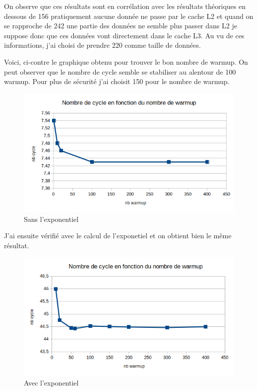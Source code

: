 \documentclass[12pt,a4paper]{article}
\begin{document}
On observe que ces résultats sont en corrélation avec les résultats théoriques
en dessous de 156 pratiquement aucune donnée ne passe par le cache L2 et 
quand on se rapproche de 242 une partie des données ne semble plus passer 
dans L2 je suppose donc que ces données vont directement dans le cache L3.
Au vu de ces informations, j'ai choisi de prendre 220 comme taille de 
données.

Voici, ci-contre le graphique obtenu pour trouver le bon nombre de warmup. On
peut observer que le nombre de cycle semble se stabiliser au alentour de 100
warmup. Pour plus de sécurité j'ai choisit 150 pour le nombre de warmup.

\begin{figure}[h]
    \includegraphics[scale=0.8]{figures/L2/L2warmup.png}
    \caption{Sans l'exponentiel}
\end{figure}

J'ai ensuite vérifié avec le calcul de l'exponetiel et on obtient bien le 
même résultat. 

\begin{figure}[h]
    \includegraphics[scale=0.8]{figures/L2/L2warmup2.png}
    \caption{Avec l'exponentiel}
\end{figure}
\end{document}
